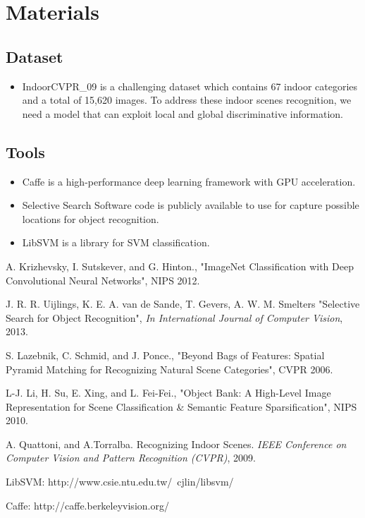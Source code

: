 \documentclass[letterpaper,twocolumn,10pt]{article}
\begin{document}
\section{Materials}
	\subsection{Dataset}
	\begin{itemize}
	\item{IndoorCVPR\_09} is a challenging dataset which contains 67
	indoor categories and a total of 15,620 images. To address these indoor
	scenes recognition, we need a model	that can exploit local and global
	discriminative information.\cite{DATA}
	\end{itemize}
	\subsection{Tools}
	\begin{itemize}
	\item{Caffe} is a high-performance deep learning framework with GPU
	acceleration. \cite{CAFFE}

	\item{Selective Search Software} code is publicly available to use
	for capture possible locations for object recognition. \cite{SS}

	\item{LibSVM} is a library for SVM classification. \cite{SVM}
	\end{itemize}

\begin{thebibliography}{10}

 A. Krizhevsky, I. Sutskever, and G. Hinton.,
"ImageNet Classification with Deep Convolutional Neural Networks",
NIPS 2012.

 J. R. R. Uijlings, K. E. A. van de Sande,
T. Gevers, A. W. M. Smelters
"Selective Search for Object Recognition",
\emph{In International Journal of Computer Vision}, 2013.

 S. Lazebnik, C. Schmid, and J. Ponce.,
"Beyond Bags of Features:
Spatial Pyramid Matching for Recognizing Natural Scene Categories",
CVPR 2006.

 L-J. Li, H. Su, E. Xing, and L. Fei-Fei.,
"Object Bank: A High-Level Image Representation for Scene Classification
\& Semantic Feature Sparsification",
NIPS 2010.

 A. Quattoni, and A.Torralba. Recognizing Indoor Scenes.
\emph{IEEE Conference on Computer Vision and Pattern Recognition (CVPR)},
2009.

 LibSVM: http://www.csie.ntu.edu.tw/~cjlin/libsvm/

 Caffe: http://caffe.berkeleyvision.org/


\end{thebibliography}
\end{document}
